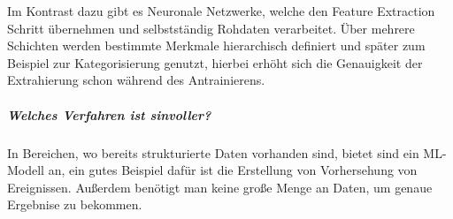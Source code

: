 Im Kontrast dazu gibt es Neuronale Netzwerke, welche den Feature Extraction Schritt übernehmen und selbstständig Rohdaten verarbeitet. Über mehrere Schichten werden bestimmte Merkmale hierarchisch definiert und später zum Beispiel zur Kategorisierung genutzt, hierbei erhöht sich die Genauigkeit der Extrahierung schon während des Antrainierens.

\subparagraph{Welches Verfahren ist sinvoller?}

In Bereichen, wo bereits strukturierte Daten vorhanden sind, bietet sind ein ML-Modell an, ein gutes Beispiel dafür ist die Erstellung von Vorhersehung von Ereignissen. Außerdem benötigt man keine große Menge an Daten, um genaue Ergebnise zu bekommen.

